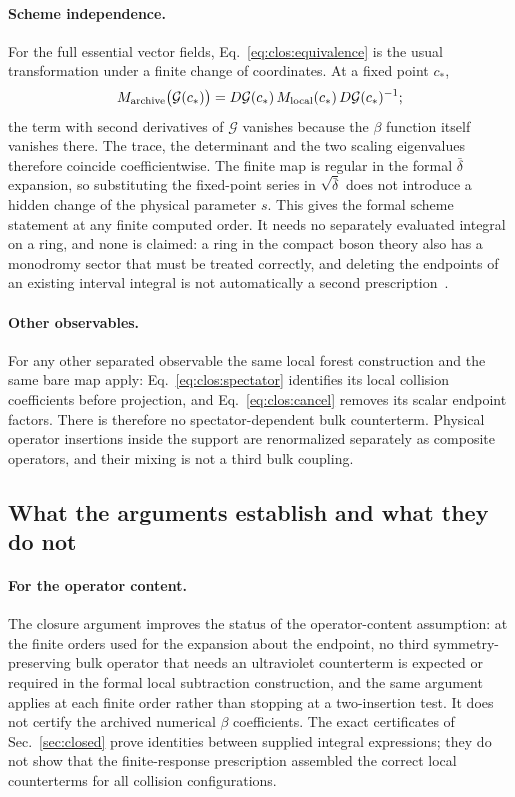 \documentclass[11pt,a4paper]{article}
\numberwithin{equation}{section}
\newcommand{\db}{\bar\delta}
\begin{document}
\paragraph{Scheme independence.} For the full essential vector fields, Eq.~\eqref{eq:clos:equivalence} is the usual
transformation under a finite change of coordinates. At a fixed point $c_*$,
\begin{equation}
 M_{\rm archive}\bigl(\mathcal G(c_*)\bigr)=D\mathcal G(c_*)\,M_{\rm local}(c_*)\,D\mathcal G(c_*)^{-1};
\end{equation}
the term with second derivatives of $\mathcal G$ vanishes because the $\beta$ function itself vanishes there. The
trace, the determinant and the two scaling eigenvalues therefore coincide coefficientwise. The finite map is regular in
the formal $\db$ expansion, so substituting the fixed-point series in $\sqrt{\db}$ does not introduce a hidden change of
the physical parameter $s$. This gives the formal scheme statement at any finite computed order. It needs no separately
evaluated integral on a ring, and none is claimed: a ring in the compact boson theory also has a monodromy sector that
must be treated correctly, and deleting the endpoints of an existing interval integral is not automatically a second
prescription~\cite{Benedetti:2025nzp}.

\paragraph{Other observables.} For any other separated observable the same local forest construction and the same bare
map apply: Eq.~\eqref{eq:clos:spectator} identifies its local collision coefficients before projection, and
Eq.~\eqref{eq:clos:cancel} removes its scalar endpoint factors. There is therefore no spectator-dependent bulk
counterterm. Physical operator insertions inside the support are renormalized separately as composite operators, and
their mixing is not a third bulk coupling.

\subsection{What the arguments establish and what they do not}\label{app:clos:scope}
\paragraph{For the operator content.} The closure argument improves the status of the operator-content assumption: at
the finite orders used for the expansion about the endpoint, no third symmetry-preserving bulk operator that needs an
ultraviolet counterterm is expected or required in the formal local subtraction construction, and the same argument
applies at each finite order rather than stopping at a two-insertion test. It does not certify the archived numerical
$\beta$ coefficients. The exact certificates of Sec.~\ref{sec:closed} prove identities between supplied integral
expressions; they do not show that the finite-response prescription assembled the correct local counterterms for all
collision configurations.
\end{document}
